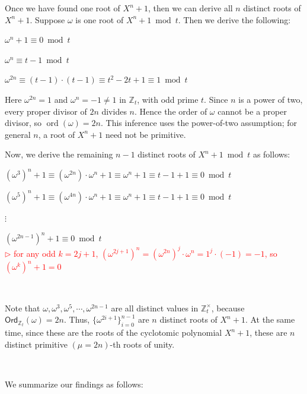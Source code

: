 Once we have found one root of $X^n + 1$, then we can derive all $n$ distinct roots of $X^n + 1$. Suppose $\omega$ is one root of $X^n + 1 \bmod t$. Then we derive the following:

$\omega^n + 1 \equiv 0 \bmod t$

$\omega^n \equiv t - 1 \bmod t$

$\omega^{2n} \equiv (t - 1)\cdot(t - 1) \equiv  t^2 - 2t + 1 \equiv   1 \bmod t$

Here $\omega^{2n}=1$ and $\omega^n=-1\ne1$ in $\mathbb Z_t$, with odd prime $t$. Since $n$ is a power of two, every proper divisor of $2n$ divides $n$. Hence the order of $\omega$ cannot be a proper divisor, so $\operatorname{ord}(\omega)=2n$. This inference uses the power-of-two assumption; for general $n$, a root of $X^n+1$ need not be primitive.

Now, we derive the remaining $n-1$ distinct roots of $X^n + 1 \bmod t$ as follows:

$(\omega^3)^n + 1 \equiv (\omega^{2n})\cdot \omega^n + 1 \equiv \omega^n + 1 \equiv t - 1 + 1 \equiv 0 \bmod t$

$(\omega^5)^n + 1 \equiv (\omega^{4n})\cdot \omega^n + 1 \equiv \omega^n + 1 \equiv t - 1 + 1 \equiv 0 \bmod t$

$\vdots$

$(\omega^{2n - 1})^n + 1 \equiv 0 \bmod t$ \\ \textcolor{red}{ $\rhd$ for any odd $k = 2j+1$, $(\omega^{2j+1})^n = (\omega^{2n})^j \cdot \omega^n = 1^j \cdot (-1) = -1$, so $(\omega^k)^n + 1 = 0$}

$ $

Note that $\omega, \omega^3, \omega^5, \cdots, \omega^{2n - 1}$ are all distinct values in $\mathbb{Z}_t^{\times}$, because $\textsf{Ord}_{\mathbb{Z}_t}(\omega) = 2n$. Thus, $\{\omega^{2i + 1}\}_{i=0}^{n-1}$ are $n$ distinct roots of $X^n + 1$. At the same time, since these are the roots of the cyclotomic polynomial $X^n + 1$, these are $n$ distinct primitive $(\mu=2n)$-th roots of unity.


$ $


We summarize our findings as follows:

